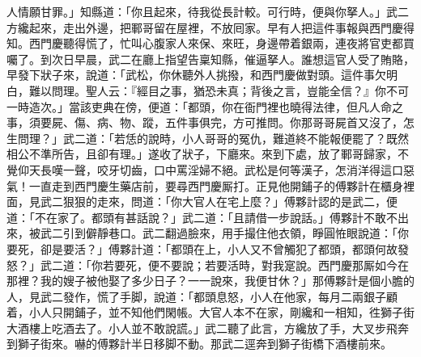 人情願甘罪。」知縣道：「你且起來，待我從長計較。{}可行時，便與你拏人。」武二方纔起來，走出外邊，把鄆哥留在屋裡，不放囘家。{}早有人把這件事報與西門慶得知。西門慶聽得慌了，忙叫心腹家人來保、來旺，{}身邊帶着銀兩，連夜將官吏都買囑了。到次日早晨，武二在廳上指望告稟知縣，催逼拏人。誰想這官人受了賄賂，早發下狀子來，說道：「武松，你休聽外人挑撥，和西門慶做對頭。這件事欠明白，難以問理。聖人云：『經目之事，猶恐未真；背後之言，豈能全信？』你不可一時造次。」當該吏典在傍，便道：「都頭，你在衙門裡也曉得法律，但凡人命之事，須要屍、傷、病、物、蹤，五件事俱完，方可推問。你那哥哥屍首又沒了，怎生問理？」{}武二道：「若恁的說時，小人哥哥的冤仇，難道終不能報便罷了？既然相公不準所告，且卻有理。」遂收了狀子，下廳來。來到下處，放了鄆哥歸家，不覺仰天長嘆一聲，咬牙切齒，口中罵淫婦不絕。武松是何等漢子，怎消洋得這口惡氣！一直走到西門慶生藥店前，要尋西門慶厮打。正見他開鋪子的傅夥計在櫃身裡面，見武二狠狠的走來，問道：「你大官人在宅上麼？」傅夥計認的是武二，便道：「不在家了。都頭有甚話說？」武二道：「且請借一步說話。」傅夥計不敢不出來，被武二引到僻靜巷口。武二翻過臉來，用手撮住他衣領，睜圓恠眼說道：「你要死，卻是要活？」{}傅夥計道：「都頭在上，小人又不曾觸犯了都頭，都頭何故發怒？」武二道：「你若要死，便不要說；若要活時，對我寔說。西門慶那厮如今在那裡？我的嫂子被他娶了多少日子？一一說來，我便甘休？」那傅夥計是個小膽的人，見武二發作，慌了手脚，說道：「都頭息怒，小人在他家，每月二兩銀子顧着，小人只開鋪子，並不知他們閑帳。大官人本不在家，剛纔和一相知，徃獅子街大酒樓上吃酒去了。小人並不敢說謊。」{}武二聽了此言，方纔放了手，大叉步飛奔到獅子街來。嚇的傅夥計半日移脚不動。那武二逕奔到獅子街橋下酒樓前來。

